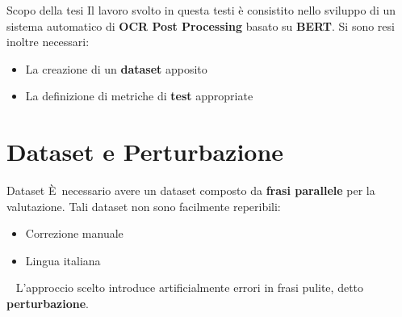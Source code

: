 \documentclass{beamer}
\newcommand{\E}{È}
\begin{document}
\begin{frame}{Scopo della tesi}
Il lavoro svolto in questa testi è consistito nello sviluppo di un sistema automatico di \textbf{OCR Post Processing} basato su \textbf{BERT}. Si sono resi inoltre necessari:
\begin{itemize}
\item La creazione di un \textbf{dataset} apposito
\item La definizione di metriche di \textbf{test} appropriate
\end{itemize}
\end{frame}
%	
%
%	


\section{Dataset e Perturbazione}

\begin{frame}{Dataset}
\E\ necessario avere un dataset composto da \textbf{frasi parallele} per la valutazione. Tali dataset non sono facilmente reperibili:
\begin{itemize}
\item Correzione manuale
\item Lingua italiana
\end{itemize}\ 
\newline \newline
L'approccio scelto introduce artificialmente errori in frasi pulite, detto \textbf{perturbazione}.
\end{frame}
\end{document}
